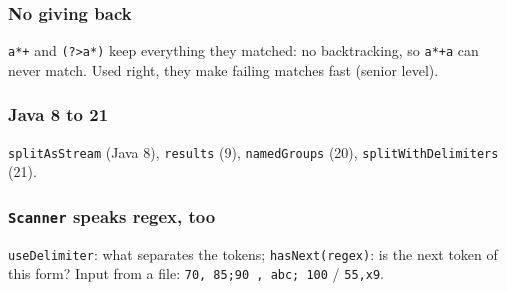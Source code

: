\documentclass[aspectratio=169,10pt,compress]{beamer}
\begin{document}




\begin{frame}[t,fragile] \frametitle{No giving back}

  \vspace{0.2em}
  \small \texttt{a*+} and \texttt{(?>a*)} keep everything they matched: no backtracking, so \texttt{a*+a} can never match. Used right, they make failing matches fast (senior level).
\end{frame}





\begin{frame}[t,fragile] \frametitle{Java 8 to 21}

  \vspace{0.2em}
  \small \texttt{splitAsStream} (Java 8), \texttt{results} (9), \texttt{namedGroups} (20), \texttt{splitWithDelimiters} (21).
\end{frame}




\begin{frame}[t,fragile] \frametitle{\texttt{Scanner} speaks regex, too}

  \vspace{0.2em}
  \small \texttt{useDelimiter}: what separates the tokens; \texttt{hasNext(regex)}: is the next token of this form? Input from a file: \texttt{70, 85;90 , abc;  100} / \texttt{55,x9}.
\end{frame}

\end{document}
